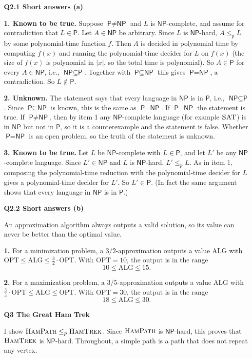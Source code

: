 \documentclass[11pt]{article}
\newcommand{\abs}[1]{\left|#1\right|}
\newcommand{\lp}{\leq_p}
\newcommand{\cproblem}[1]{\textsc{#1}}
\renewcommand{\P}{\textsf{P}}
\newcommand{\NP}{\textsf{NP}}
\newcommand{\SAT}{\cproblem{SAT}}
\newcommand{\HP}{\cproblem{HamPath}}
\newcommand{\HT}{\cproblem{HamTrek}}
\newcommand{\OPT}{\mathrm{OPT}}
\newcommand{\ALG}{\mathrm{ALG}}
\newcommand{\qpage}[1]{\clearpage\noindent\textbf{\large #1}\par\medskip}
\begin{document}
\qpage{Q2.1 Short answers (a)}

\textbf{1. Known to be true.}
Suppose $\P \neq \NP$ and $L$ is $\NP$-complete, and assume for contradiction that $L \in \P$.
Let $A \in \NP$ be arbitrary.
Since $L$ is $\NP$-hard, $A \lp L$ by some polynomial-time function $f$.
Then $A$ is decided in polynomial time by computing $f(x)$ and running the polynomial-time decider for $L$ on $f(x)$ (the size of $f(x)$ is polynomial in $\abs{x}$, so the total time is polynomial).
So $A \in \P$ for every $A \in \NP$, i.e., $\NP \subseteq \P$.
Together with $\P \subseteq \NP$ this gives $\P = \NP$, a contradiction.
So $L \notin \P$.

\textbf{2. Unknown.}
The statement says that every language in $\NP$ is in $\P$, i.e., $\NP \subseteq \P$.
Since $\P \subseteq \NP$ is known, this is the same as $\P = \NP$.
If $\P = \NP$ the statement is true.
If $\P \neq \NP$, then by item 1 any $\NP$-complete language (for example $\SAT$) is in $\NP$ but not in $\P$, so it is a counterexample and the statement is false.
Whether $\P = \NP$ is an open problem, so the truth of the statement is unknown.

\textbf{3. Known to be true.}
Let $L$ be $\NP$-complete with $L \in \P$, and let $L'$ be any $\NP$-complete language.
Since $L' \in \NP$ and $L$ is $\NP$-hard, $L' \lp L$.
As in item 1, composing the polynomial-time reduction with the polynomial-time decider for $L$ gives a polynomial-time decider for $L'$.
So $L' \in \P$.
(In fact the same argument shows that every language in $\NP$ is in $\P$.)

\qpage{Q2.2 Short answers (b)}

An approximation algorithm always outputs a valid solution, so its value can never be better than the optimal value.

\textbf{1.} For a minimization problem, a $3/2$-approximation outputs a value $\ALG$ with $\OPT \leq \ALG \leq \frac{3}{2} \cdot \OPT$.
With $\OPT = 10$, the output is in the range
\[
  10 \leq \ALG \leq 15.
\]

\textbf{2.} For a maximization problem, a $3/5$-approximation outputs a value $\ALG$ with $\frac{3}{5} \cdot \OPT \leq \ALG \leq \OPT$.
With $\OPT = 30$, the output is in the range
\[
  18 \leq \ALG \leq 30.
\]

\qpage{Q3 The Great Ham Trek}

I show $\HP \lp \HT$.
Since $\HP$ is $\NP$-hard, this proves that $\HT$ is $\NP$-hard.
Throughout, a simple path is a path that does not repeat any vertex.
\end{document}
